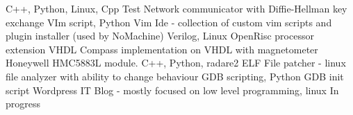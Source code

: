 

\begin{cventries}

  \cventry
    {C++, Python, Linux, Cpp Test }
    {Network communicator with Diffie-Hellman key exchange} 
    {}
    {}
    {}
  \cventry
    {VIm script, Python}
    {Vim Ide - collection of custom vim scripts and plugin installer (used by NoMachine)}
    {}
    {}
    {}
  \cventry
    {Verilog, Linux}
    {OpenRisc processor extension}
    {}
    {}
    {}
  \cventry
    {VHDL}
    {Compass implementation on VHDL with magnetometer Honeywell HMC5883L module.}
    {}
    {}
    {}
  \cventry
    {C++, Python, radare2}
    {ELF File patcher - linux file analyzer with ability to change behaviour}
    {}
    {}
    {}
  \cventry
    {GDB scripting, Python}
    {GDB init script}
    {}
    {}
    {}
  \cventry
    {Wordpress}
    {IT Blog - mostly focused on low level programming, linux}
    {In progress}
    {}
    {}
\end{cventries}
